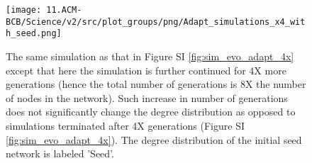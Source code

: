 \documentclass[12pt]{article}	%
\begin{document}
\begin{figure}[H]%
        \centering
                \texttt{[image: 11.ACM-BCB/Science/v2/src/plot\_groups/png/Adapt\_simulations\_x4\_with\_seed.png]}
                \caption
                    {
                        The same simulation as that in Figure SI \ref{fig:sim_evo_adapt_4x} except that here the simulation is further continued for 4X more generations (hence the total number of generations is 8X the number of nodes in the network). Such increase in number of generations does not significantly change the degree distribution as opposed to simulations terminated after 4X generations (Figure SI \ref{fig:sim_evo_adapt_4x}). The degree distribution of the initial seed network is labeled 'Seed'.
                    }
                \label{fig:sim_evo_adapt_8x}
\end{figure}

\clearpage %


\newpage


\end{document}
